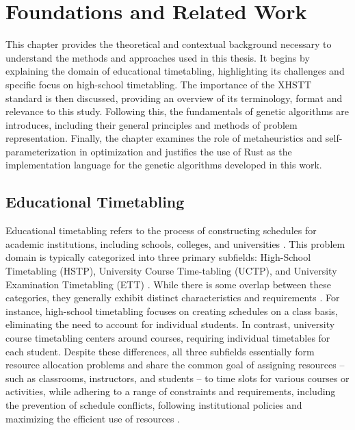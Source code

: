 \documentclass[english,examples]{isasthesis}
\begin{document}
\chapter{Foundations and Related Work}
This chapter provides the theoretical and contextual background necessary to
understand the methods and approaches used in this thesis.
It begins by explaining the domain of educational timetabling, highlighting its
challenges and specific focus on high-school timetabling.
The importance of the XHSTT standard is then discussed, providing an overview
of its terminology, format and relevance to this study.
Following this, the fundamentals of genetic algorithms are introduces,
including their general principles and methods of problem representation.
Finally, the chapter examines the role of metaheuristics and
self-parameterization in optimization and justifies the use of Rust as the
implementation language for the genetic algorithms developed in this work.

\section{Educational Timetabling}
Educational timetabling refers to the process of constructing schedules for
academic institutions, including schools, colleges, and universities
\cite{Ceschia2023}.
This problem domain is typically categorized into three primary subfields:
High-School Timetabling (HSTP), University Course Time-tabling (UCTP), and
University Examination Timetabling (ETT)
\cite{kingston2013educational,schaerf1999survey}.
While there is some overlap between these categories, they generally exhibit
distinct characteristics and requirements \cite{Beligiannis2009}.
For instance, high-school timetabling focuses on creating schedules on a class
basis, eliminating the need to account for individual students.
In contrast, university course timetabling centers around courses, requiring
individual timetables for each student.
Despite these differences, all three subfields essentially form resource
allocation problems and share the common goal of assigning resources -- such as
classrooms, instructors, and students -- to time slots for various courses or
activities, while adhering to a range of constraints and requirements,
including the prevention of schedule conflicts, following institutional
policies and maximizing the efficient use of resources \cite{Beligiannis2009}.
\end{document}

